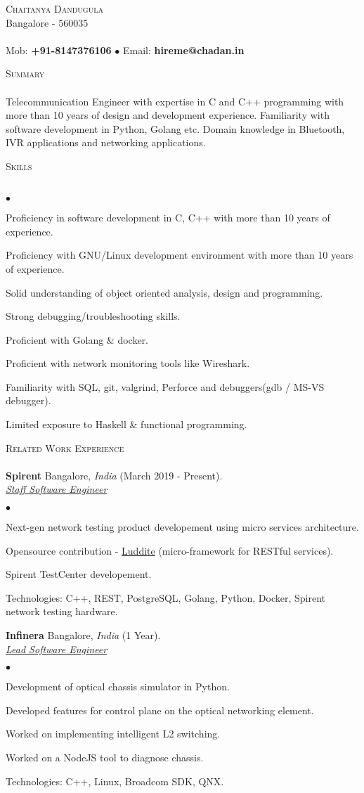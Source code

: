 \documentclass[a4paper]{article}
\newcommand{\lineunder}{\vspace*{-8pt} \\ \hspace*{-18pt} \hrulefill \\}
\newcommand{\header}[1]{{\hspace*{-15pt}\vspace*{6pt} \textsc{#1}} \vspace*{-6pt} \lineunder}
\newcommand{\employer}[4]{{ \textbf{#1} #2  (#3).\\ \underline{\emph{#4}}\\  }}
\newcommand{\contact}[3]{
\vspace*{-8pt}
\begin{center}
{\LARGE \scshape {#1}}\\
#2 \lineunder
#3
\end{center}
\vspace*{-8pt}
}
\newenvironment{achievements}{\begin{list}{$\bullet$}{\topsep 0pt \itemsep -2pt}}{\vspace*{4pt}\end{list}}
\begin{document}
\small
\smallskip
\contact{Chaitanya Dandugula}
{Bangalore - 560035}
{Mob: \textbf{+91-8147376106} $\bullet$ Email: \textbf{hireme@chadan.in}}
\vspace*{5pt}

\header{Summary}
Telecommunication Engineer with expertise in C and C++ programming with more than 10 years of design and development experience. Familiarity with software development in Python, Golang etc.
Domain knowledge in Bluetooth, IVR applications and networking applications.

\header{Skills}
\begin{achievements}
\item Proficiency in software development in C, C++ with more than 10 years of experience.
\item Proficiency with GNU/Linux development environment with more than 10 years of experience.
\item Solid understanding of object oriented analysis, design and programming.
\item Strong debugging/troubleshooting skills.
\item Proficient with Golang \& docker.
\item Proficient with network monitoring tools like Wireshark.
\item Familiarity with SQL, git, valgrind, Perforce and debuggers(gdb / MS-VS debugger).
\item Limited exposure to Haskell \& functional programming.
\end{achievements}

\header{Related Work Experience}
\employer{Spirent} {Bangalore, \textit{India}} {March 2019 - Present} {Staff Software Engineer}
	\begin{achievements}
          \item Next-gen network testing product developement using micro services architecture. 
          \item Opensource contribution - \href{https://github.com/SpirentOrion/luddite.v2}{Luddite} (micro-framework for RESTful services).
          \item Spirent TestCenter developement.
          \item Technologies: C++, REST, PostgreSQL, Golang, Python, Docker, Spirent network testing hardware.
	\end{achievements}
\employer{Infinera} {Bangalore, \textit{India}} {1 Year} {Lead Software Engineer}
	\begin{achievements}
          \item Development of optical chassis simulator in Python. 
          \item Developed features for control plane on the optical networking element.
          \item Worked on implementing intelligent L2 switching.
          \item Worked on a NodeJS tool to diagnose chassis.
          \item Technologies: C++, Linux, Broadcom SDK, QNX.
	\end{achievements}
\end{document}
